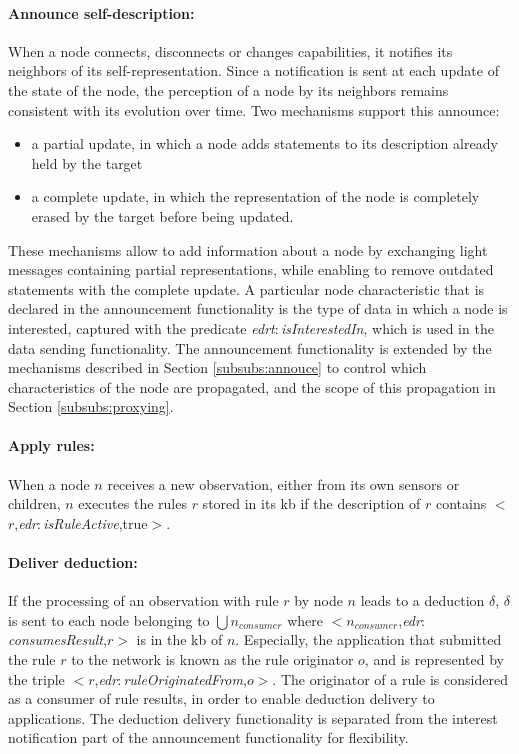 \documentclass{iosart2c}
\newcommand{\namespace}[1]{\textit{#1$:$}}
\newcommand{\concept}[2]{\namespace{#1}\-\textit{#2}}
\newcommand{\triplet}[3]{$<$#1,\textit{#2},#3$>$}
\begin{document}
\paragraph{Announce self-description:}
When a node connects, disconnects or changes capabilities, it notifies its neighbors of its self-representation.
Since a notification is sent at each update of the state of the node, the perception of a node by its neighbors remains consistent with its evolution over time.
Two mechanisms support this announce: 
\begin{itemize}
	\item a partial update, in which a node adds statements to its description already held by the target
	\item a complete update, in which the representation of the node is completely erased by the target before being updated.
\end{itemize}
These mechanisms allow to add information about a node by exchanging light messages containing partial representations, while enabling to remove outdated statements with the complete update. 
A particular node characteristic that is declared in the announcement functionality is the type of data in which a node is interested, captured with the predicate \concept{edrt}{is\-Interested\-In}, which is used in the data sending functionality.
The announcement functionality is extended by the mechanisms described in Section \textsection \ref{subsubs:annouce} to control which characteristics of the node are propagated, and the scope of this propagation in Section \textsection \ref{subsubs:proxying}.

\paragraph{Apply rules:}
When a node $n$ receives a new observation, either from its own sensors or children, $n$ executes the rules $r$ stored in its \gls{kb} if the description of $r$ contains \triplet{$r$}{\concept{edr}{is\-Rule\-Active}}{true}.

\paragraph{Deliver deduction:}
\label{par:deduction_delivery}
If the processing of an observation with rule $r$ by node $n$ leads to a deduction $\delta$, $\delta$ is sent to each node belonging to $\bigcup n_{consumer}$ where \triplet{$n_{consumer}$}{\concept{edr}{consumes\-Result}}{$r$} is in the \gls{kb} of $n$.
Especially, the application that submitted the rule $r$ to the network is known as the rule originator $o$, and is represented by the triple \triplet{$r$}{\concept{edr}{rule\-Originated\-From}}{$o$}.
The originator of a rule is considered as a consumer of rule results, in order to enable deduction delivery to applications.
The deduction delivery functionality is separated from the interest notification part of the announcement functionality for flexibility.
\end{document}

